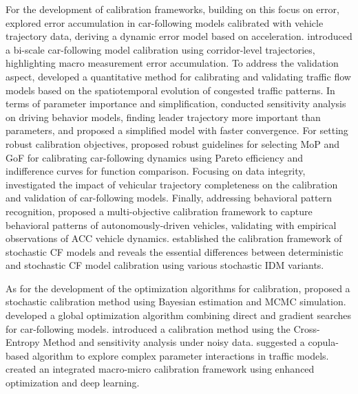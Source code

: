 \documentclass[a4paper,fleqn]{cas-sc}
\begin{document}
For the development of calibration frameworks, building on this focus on error, \cite{jin_reducing_2014} explored error accumulation in car-following models calibrated with vehicle trajectory data, deriving a dynamic error model based on acceleration. \cite{longBiScaleCarFollowingModelCalibration2024a} introduced a bi-scale car-following model calibration using corridor-level trajectories, highlighting macro measurement error accumulation. To address the validation aspect, \cite{treiberValidationTrafficFlowModels2012} developed a quantitative method for calibrating and validating traffic flow models based on the spatiotemporal evolution of congested traffic patterns. In terms of parameter importance and simplification, \cite{punzo_we_2015} conducted sensitivity analysis on driving behavior models, finding leader trajectory more important than parameters, and proposed a simplified model with faster convergence. For setting robust calibration objectives, \cite{punzoCalibrationCarFollowingDynamicsAutomated2021} proposed robust guidelines for selecting MoP and GoF for calibrating car-following dynamics using Pareto efficiency and indifference curves for function comparison. Focusing on data integrity, \cite{sharmaMoreAlwaysBetterImpact2019b} investigated the impact of vehicular trajectory completeness on the calibration and validation of car-following models. Finally, addressing behavioral pattern recognition, \cite{zhengMultiObjectiveCalibrationFrameworkCapturing2023b} proposed a multi-objective calibration framework to capture behavioral patterns of autonomously-driven vehicles, validating with empirical observations of ACC vehicle dynamics. \cite{zhouCalibrationStochasticCarFollowing2025a} established the calibration framework of stochastic CF models and reveals the essential differences between deterministic and stochastic CF model calibration using various stochastic IDM variants.

As for the development of the optimization algorithms for calibration, \cite{rahman_improving_2015} proposed a stochastic calibration method using Bayesian estimation and MCMC simulation. \cite{liGlobalOptimizationAlgorithmTrajectory2016b} developed a global optimization algorithm combining direct and gradient searches for car-following models. \cite{zhongCrossEntropyMethodProbabilisticSensitivity2016b} introduced a calibration method using the Cross-Entropy Method and sensitivity analysis under noisy data. \cite{fardCopulaBasedEstimationDistributionAlgorithm2019b} suggested a copula-based algorithm to explore complex parameter interactions in traffic models. \cite{wangIntegratedSelfConsistentMacroMicroTraffic2024a} created an integrated macro-micro calibration framework using enhanced optimization and deep learning.
\end{document}
